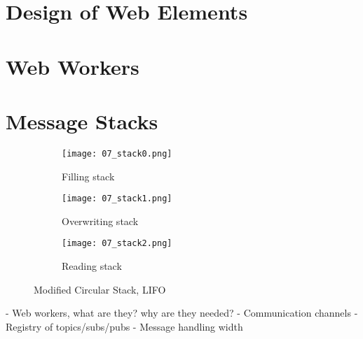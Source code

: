 \section{Design of Web Elements}

\section{Web Workers}

    

\section{Message Stacks}

    \begin{figure}[htbp]
        \centering
        \begin{subfigure}[t]{0.32\textwidth}
            \texttt{[image: 07\_stack0.png]}
            \caption{Filling stack}
        \end{subfigure}
        \begin{subfigure}[t]{0.32\textwidth}
            \texttt{[image: 07\_stack1.png]}
            \caption{Overwriting stack}
        \end{subfigure}
        \begin{subfigure}[t]{0.32\textwidth}
            \texttt{[image: 07\_stack2.png]}
            \caption{Reading stack}
        \end{subfigure}
        \caption{Modified Circular Stack, \ac{LIFO}}\label{fig:circleStack}
    \end{figure}

- Web workers, what are they? why are they needed?
- Communication channels
- Registry of topics/subs/pubs
- Message handling
width